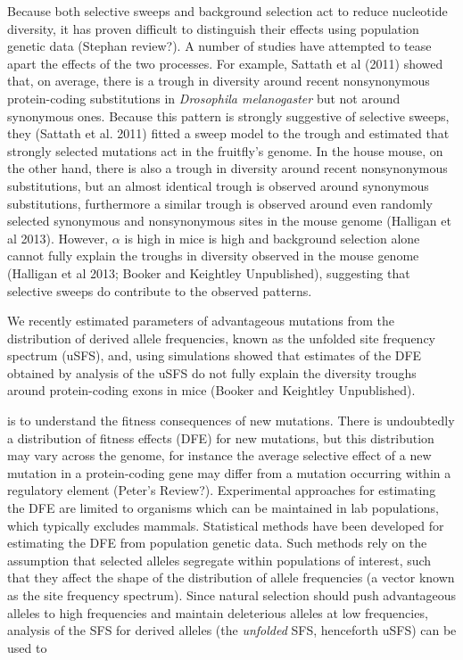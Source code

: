 \documentclass[11pt]{article}
\begin{document}
Because both selective sweeps and background selection act to reduce nucleotide diversity, it has proven difficult to distinguish their effects using population genetic data (Stephan review?). A number of studies have attempted to tease apart the effects of the two processes. For example, Sattath et al (2011) showed that, on average, there is a trough in diversity around recent nonsynonymous protein-coding substitutions in \textit{Drosophila melanogaster} but not around synonymous ones. Because this pattern is strongly suggestive of selective sweeps, they (Sattath et al. 2011) fitted a sweep model to the trough and estimated that strongly selected mutations act in the fruitfly's genome.  In the house mouse, on the other hand, there is also a trough in diversity around recent nonsynonymous substitutions, but an almost identical trough is observed around synonymous substitutions, furthermore a similar trough is observed around even randomly selected synonymous and nonsynonymous sites in the mouse genome (Halligan et al 2013). However, $\alpha$ is high in mice is high and background selection alone cannot fully explain the troughs in diversity observed in the mouse genome (Halligan et al 2013; Booker and Keightley Unpublished), suggesting that selective sweeps do contribute to the observed patterns.

We recently estimated parameters of advantageous mutations from the distribution of derived allele frequencies, known as the unfolded site frequency spectrum (uSFS), and, using simulations showed that estimates of the DFE obtained by analysis of the uSFS do not fully explain the diversity troughs around protein-coding exons in mice (Booker and Keightley Unpublished). 


 is to understand the fitness consequences of new mutations. There is undoubtedly a distribution of fitness effects (DFE) for new mutations, but this distribution may vary across the genome, for instance the average selective effect of a new mutation in a protein-coding gene may differ from a mutation occurring within a regulatory element (Peter's Review?). Experimental approaches for estimating the DFE are limited to organisms which can be maintained in lab populations, which typically excludes mammals. Statistical methods have been developed for estimating the DFE from population genetic data. Such methods rely on the assumption that selected alleles segregate within populations of interest, such that they affect the shape of the distribution of allele frequencies (a vector known as the site frequency spectrum). Since natural selection should push advantageous alleles to high frequencies and maintain deleterious alleles at low frequencies, analysis of the SFS for derived alleles (the \textit{unfolded} SFS, henceforth uSFS) can be used to 
\end{document}
